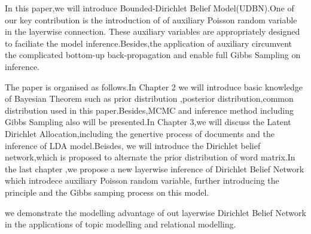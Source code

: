 In this paper,we will introduce Bounded-Dirichlet Belief Model(UDBN).One of our key contribution is the introduction of of auxiliary Poisson random variable in the layerwise connection. These auxiliary variables are appropriately designed to faciliate the model inference.Besides,the application of auxiliary circumvent the complicated bottom-up back-propagation and enable full Gibbs Sampling on inference.

The paper is organised as follows.In Chapter 2 we will introduce basic knowledge of Bayesian Theorem such as prior distribution ,posterior distribution,common distribution used in this paper.Besides,MCMC and inference method including Gibbs Sampling also will be presented.In Chapter 3,we will discuss the Latent Dirichlet Allocation,including the genertive process of documents and the inference of LDA model.Beisdes, we will introduce the Dirichlet belief network,which is proposed to alternate the prior distribution of word matrix.In the last chapter ,we propose a new layerwise inference of Dirichlet Belief Network which introdece auxiliary Poisson random variable, further introducing the principle and the Gibbs samping process on this model.

we demonstrate the modelling advantage of out layerwise  Dirichlet Belief Network in the applications of topic modelling and relational modelling.
